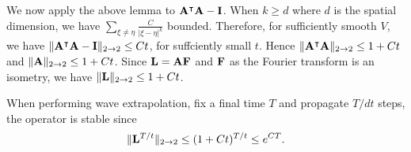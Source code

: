 We now apply the above lemma to $\mathbf{A}^{\intercal}\mathbf{A} - \mathbf{I}$.  When
$k \geq d$ where $d$ is the spatial dimension, we have
$\sum\limits_{\xi\neq\eta}\frac{C}{|\xi-\eta|^k}$ bounded.  Therefore,
for sufficiently smooth $V$, we have $ \|\mathbf{A}^{\intercal}\mathbf{A}
- \mathbf{I} \|_{2\to 2} \leq Ct$, for suffciently small $t$. Hence
$\|\mathbf{A}^{\intercal}\mathbf{A} \|_{2\to 2} \leq 1 + Ct$ and $\|\mathbf{A} \|_{2\to
2} \leq 1 + Ct$. Since $\mathbf{L} = \mathbf{A} \mathbf{F}$ and $\mathbf{F}$ as the Fourier transform
is an isometry, we have $\|\mathbf{L} \|_{2\to 2} \leq 1 + Ct$.

When performing wave extrapolation, fix a final time $T$ and propagate
$T/dt$ steps, the operator is stable since
\begin{equation}
        \|\mathbf{L}^{T/t} \|_{2\to 2} \leq (1 + Ct)^{T/t} \leq e^{CT}.
\end{equation}



